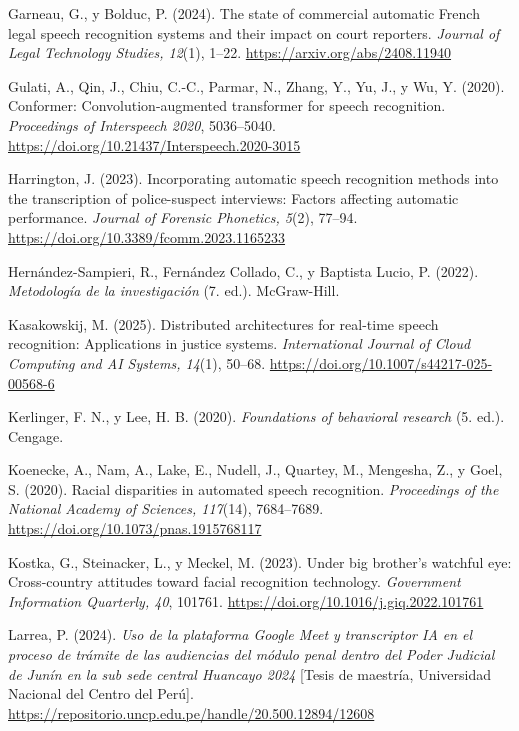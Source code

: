 \documentclass[12pt,a4paper,oneside]{report}
\begin{document}
\vspace{6pt}
Garneau, G., y Bolduc, P. (2024). The state of commercial automatic French legal speech recognition systems and their impact on court reporters. \textit{Journal of Legal Technology Studies, 12}(1), 1--22. \url{https://arxiv.org/abs/2408.11940}

\vspace{6pt}
Gulati, A., Qin, J., Chiu, C.-C., Parmar, N., Zhang, Y., Yu, J., y Wu, Y. (2020). Conformer: Convolution-augmented transformer for speech recognition. \textit{Proceedings of Interspeech 2020}, 5036--5040. \url{https://doi.org/10.21437/Interspeech.2020-3015}

\vspace{6pt}
Harrington, J. (2023). Incorporating automatic speech recognition methods into the transcription of police-suspect interviews: Factors affecting automatic performance. \textit{Journal of Forensic Phonetics, 5}(2), 77--94. \url{https://doi.org/10.3389/fcomm.2023.1165233}

\vspace{6pt}
Hernández-Sampieri, R., Fernández Collado, C., y Baptista Lucio, P. (2022). \textit{Metodología de la investigación} (7.\textordfeminine{} ed.). McGraw-Hill.

\vspace{6pt}
Kasakowskij, M. (2025). Distributed architectures for real-time speech recognition: Applications in justice systems. \textit{International Journal of Cloud Computing and AI Systems, 14}(1), 50--68. \url{https://doi.org/10.1007/s44217-025-00568-6}

\vspace{6pt}
Kerlinger, F. N., y Lee, H. B. (2020). \textit{Foundations of behavioral research} (5.\textordfeminine{} ed.). Cengage.

\vspace{6pt}
Koenecke, A., Nam, A., Lake, E., Nudell, J., Quartey, M., Mengesha, Z., y Goel, S. (2020). Racial disparities in automated speech recognition. \textit{Proceedings of the National Academy of Sciences, 117}(14), 7684--7689. \url{https://doi.org/10.1073/pnas.1915768117}

\vspace{6pt}
Kostka, G., Steinacker, L., y Meckel, M. (2023). Under big brother's watchful eye: Cross-country attitudes toward facial recognition technology. \textit{Government Information Quarterly, 40}, 101761. \url{https://doi.org/10.1016/j.giq.2022.101761}

\vspace{6pt}
Larrea, P. (2024). \textit{Uso de la plataforma Google Meet y transcriptor IA en el proceso de trámite de las audiencias del módulo penal dentro del Poder Judicial de Junín en la sub sede central Huancayo 2024} [Tesis de maestría, Universidad Nacional del Centro del Perú]. \url{https://repositorio.uncp.edu.pe/handle/20.500.12894/12608}
\end{document}
